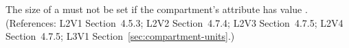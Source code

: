 The size of a \Compartment must not be set if the compartment's
 attribute has value . (References: L2V1
Section~4.5.3; L2V2 Section~4.7.4; L2V3 Section~4.7.5; L2V4 Section~4.7.5; 
L3V1 Section~\ref{sec:compartment-units}.)
